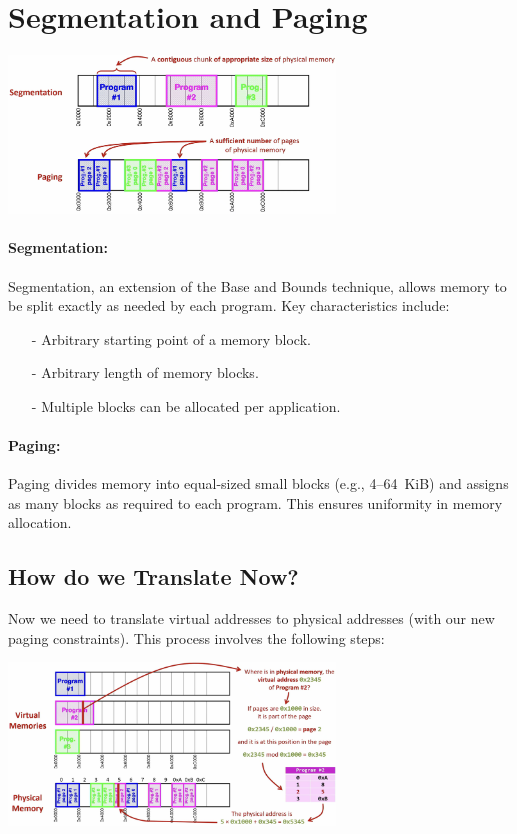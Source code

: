 \section{Segmentation and Paging}
\begin{center}
    \includegraphics[width=0.65\textwidth]{chapters/chapter3c/images/segPage.png}
\end{center}
\paragraph{Segmentation:} Segmentation, an extension of the Base and Bounds technique, allows memory to be split exactly as needed by each program. Key characteristics include:
\begin{itemize}
    \item[-] Arbitrary starting point of a memory block.
    \item[-] Arbitrary length of memory blocks.
    \item[-] Multiple blocks can be allocated per application.
\end{itemize}

\paragraph{Paging:} Paging divides memory into equal-sized small blocks (e.g., 4–64~KiB) and assigns as many blocks as required to each program. This ensures uniformity in memory allocation.

\subsection{How do we Translate Now?}
Now we need to translate virtual addresses to physical addresses (with our new paging constraints). This process involves the following steps:
\begin{center}
    \includegraphics[width=0.65\textwidth]{chapters/chapter3c/images/translate.png}
\end{center}

